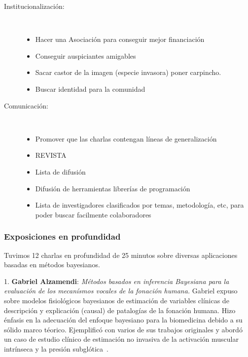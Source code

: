 \documentclass[a4paper,11pt]{book}
\theoremstyle{definition}
\begin{document}
\begin{description}
\item[Institucionalización:]\phantom{.} \\[-0.7cm]
\begin{itemize} \setlength\itemsep{0cm}
\item Hacer una Asociación para conseguir mejor financiación
\item Conseguir auspiciantes amigables
\item Sacar castor de la imagen (especie invasora) poner carpincho.
\item Buscar identidad para la comunidad
\end{itemize}

\item[Comunicación:]\phantom{.} \\[-0.7cm]
\begin{itemize} \setlength\itemsep{0cm}
\item Promover que las charlas contengan líneas de generalización
\item REVISTA
\item Lista de difusión
\item Difusión de herramientas librerías de programación
\item Lista de investigadores clasificados por temas, metodología, etc, para poder buscar facilmente colaboradores
\end{itemize}

\end{description}


\subsubsection{Exposiciones en profundidad}

Tuvimos 12 charlas en profundidad de 25 minutos sobre diversas aplicaciones basadas en métodos bayesianos.


\hspace{0.6cm} 1. \textbf{Gabriel Alzamendi}: \emph{Métodos basados en inferencia Bayesiana para la evaluación de los mecanísmos vocales de la fonación humana.}
%
Gabriel expuso sobre modelos fisiológicos bayesianos de estimación de variables clínicas de descripción y explicación (causal) de patalogías de la fonación humana.
%
Hizo énfasis en la adecuación del enfoque bayesiano para la biomedicina debido a su sólido marco téorico.
%
Ejemplificó con varios de sus trabajos originales y abordó un caso de estudio clínico de estimación no invasiva de la activación muscular intrínseca y la presión subglótica~\cite{Alzamendi2020, Ibarra2021}.
\end{document}
